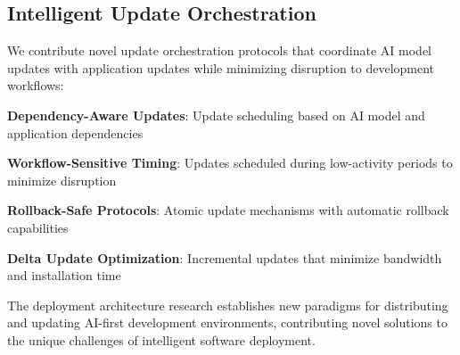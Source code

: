 \subsection*{Intelligent Update Orchestration}

We contribute novel update orchestration protocols that coordinate AI model updates with application updates while minimizing disruption to development workflows:

\begin{expandedlist}
    \item \textbf{Dependency-Aware Updates}: Update scheduling based on AI model and application dependencies
    \item \textbf{Workflow-Sensitive Timing}: Updates scheduled during low-activity periods to minimize disruption
    \item \textbf{Rollback-Safe Protocols}: Atomic update mechanisms with automatic rollback capabilities
    \item \textbf{Delta Update Optimization}: Incremental updates that minimize bandwidth and installation time
\end{expandedlist}

The deployment architecture research establishes new paradigms for distributing and updating AI-first development environments, contributing novel solutions to the unique challenges of intelligent software deployment.